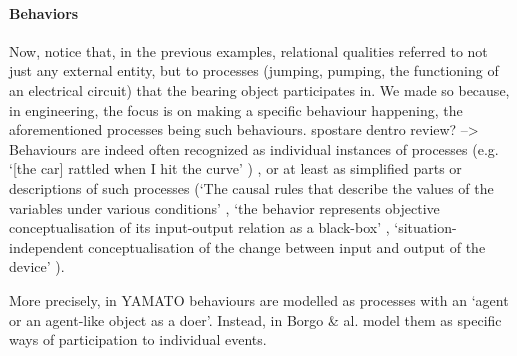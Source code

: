 \documentclass[sw]{iosart2x}
\newcommand{\YAMATO}{\textsc{YAMATO}\xspace}
\newcommand{\firstTimeKeyWord}[1]{\textit{#1}}
\newcommand{\quotes}[1]{`#1'}
\newcommand{\TODO}[1]{{\color{red} #1}}
\begin{document}
\paragraph{Behaviors}
Now, notice that, in the previous examples, relational qualities referred to not just any external entity, but to processes (jumping, pumping, the functioning of an electrical circuit) that the bearing object participates in. 
We made so because, in engineering, the focus is on making a specific behaviour happening, the aforementioned processes being such behaviours. 
\TODO{spostare dentro review? --> }Behaviours are indeed often recognized as individual instances of processes (e.g. \quotes{[the car] rattled when I hit the curve} \cite{chandrasekaranFunctionDeviceRepresentation2000})%
, or at least as simplified parts or descriptions of such processes (\quotes{The causal rules that describe the values of the variables under various conditions} \cite{chandrasekaranFunctionDeviceRepresentation2000}, \quotes{the behavior represents objective conceptualisation of its input-output relation as a black-box} \cite{kitamuraOntologicalModelDevice2006}, \quotes{situation-independent conceptualisation of the change between input and output of the device} \cite{mizoguchiFunctionalOntologyArtifacts2009}). 

More precisely, in \YAMATO behaviours are modelled as processes with an \quotes{agent or an agent-like object as a doer}. 
Instead, in \cite{borgoFormalOntologicalPerspective2009} Borgo \& al.  model them as specific ways of participation to individual events. 

\end{document}
